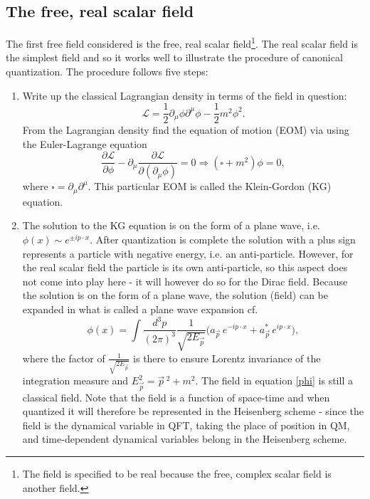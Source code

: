 \subsection*{The free, real scalar field}
The first free field considered is the free, real scalar field\footnote{The field is specified to be real because the free, complex scalar field is another field.}. The real scalar field is the simplest field and so it works well to illustrate the procedure of canonical quantization. The procedure follows five steps:
\begin{enumerate}
	\item Write up the classical Lagrangian density in terms of the field in question:
	\begin{equation}
		\mathcal{L}=\frac{1}{2}\partial_\mu\phi\partial^\mu\phi-\frac{1}{2}m^2\phi^2.
		\label{Lagrange scalar}
	\end{equation} 
	From the Lagrangian density find the equation of motion (EOM) via using the Euler-Lagrange equation
	\begin{equation}
		\frac{\partial \mathcal{L}}{\partial \phi}-\partial_\mu\frac{\partial \mathcal{L}}{\partial (\partial_\mu\phi)}=0\Rightarrow (\square+m^2)\phi=0,
	\end{equation} 
	where $\square=\partial_\mu\partial^\mu$. This particular EOM is called the Klein-Gordon (KG) equation.
	
	\item The solution to the KG equation is on the form of a plane wave, i.e. $\phi(x)\sim e^{\pm ip\cdot x}$. After quantization is complete the solution with a plus sign represents a particle with negative energy, i.e. an anti-particle. However, for the real scalar field the particle is its own anti-particle, so this aspect does not come into play here - it will however do so for the Dirac field. Because the solution is on the form of a plane wave, the solution (field) can be expanded in what is called a plane wave expansion cf.
	\begin{equation}
		\phi(x)=\int \frac{d^3 p}{(2\pi)^3}\frac{1}{\sqrt{2E_{\vec{p}}}}\bigg(a_{\vec{p}}\,e^{-ip\cdot x}+a_{\vec{p}}^*\,e^{ip\cdot x}\bigg),
		\label{phi}
	\end{equation} 
	where the factor of $\frac{1}{\sqrt{2E_{\vec{p}}}}$ is there to ensure Lorentz invariance of the integration measure and $E_{\vec{p}}^2=\vec{p}\,^2+m^2$. The field in equation \eqref{phi} is still a classical field. Note that the field is a function of space-time and when quantized it will therefore be represented in the Heisenberg scheme - since the field is the dynamical variable in QFT, taking the place of position in QM, and time-dependent dynamical variables belong in the Heisenberg scheme. 
	

\end{enumerate}
